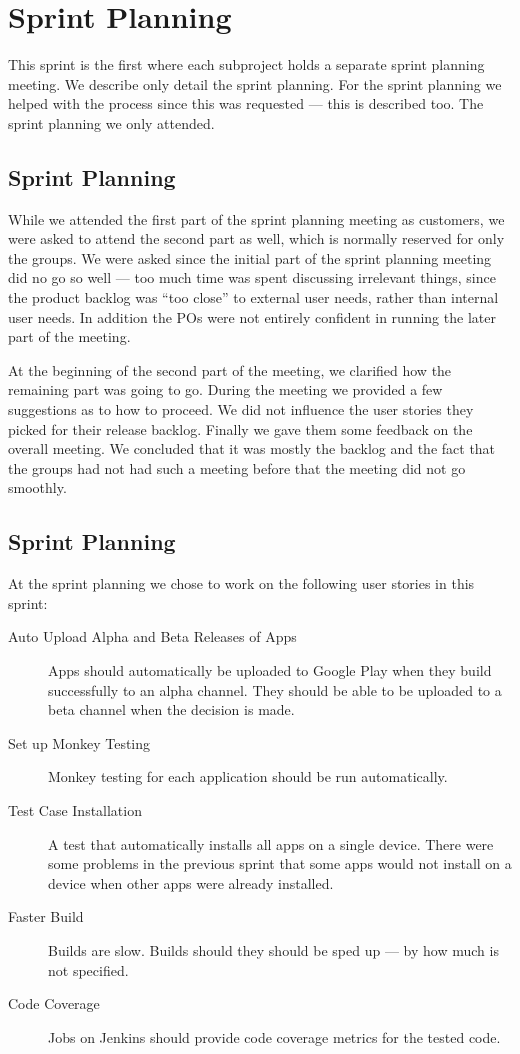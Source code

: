 \chapter{Sprint Planning}
This sprint is the first where each subproject holds a separate sprint planning meeting. We describe only detail the \bd sprint planning. For the \db sprint planning we helped with the process since this was requested --- this is described too. The \gui sprint planning we only attended.

\section{\dbtitle Sprint Planning}
While we attended the first part of the \db sprint planning meeting as customers, we were asked to attend the second part as well, which is normally reserved for only the \db groups. We were asked since the initial part of the sprint planning meeting did no go so well --- too much time was spent discussing irrelevant things, since the product backlog was ``too close'' to external user needs, rather than internal user needs. In addition the \db POs were not entirely confident in running the later part of the meeting.

At the beginning of the second part of the meeting, we clarified how the remaining part was going to go. During the meeting we provided a few suggestions as to how to proceed. We did not influence the user stories they picked for their release backlog. Finally we gave them some feedback on the overall meeting. We concluded that it was mostly the backlog and the fact that the \db groups had not had such a meeting before that the meeting did not go smoothly.

\section{\bdtitle Sprint Planning}
At the \bd sprint planning we chose to work on the following user stories in this sprint:

\begin{description}
  \item[Auto Upload Alpha and Beta Releases of Apps] Apps should automatically be uploaded to Google Play when they build successfully to an alpha channel. They should be able to be uploaded to a beta channel when the decision is made.
  \item[Set up Monkey Testing] Monkey testing for each application should be run automatically.
  \item[Test Case Installation] A test that automatically installs all apps on a single device. There were some problems in the previous sprint that some apps would not install on a device when other apps were already installed.
  \item[Faster Build] Builds are slow. Builds should they should be sped up --- by how much is not specified.
  \item[Code Coverage] Jobs on Jenkins should provide code coverage metrics for the tested code.
\end{description}

